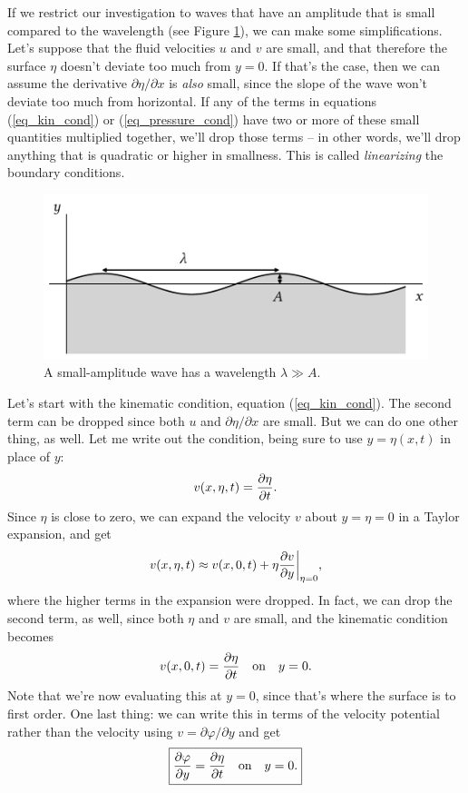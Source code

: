 If we restrict our investigation to waves that have an amplitude that is small compared to the wavelength (see Figure \ref{fig_small_wave}), we can make some simplifications.  Let's suppose that the fluid velocities $u$ and $v$ are small, and that therefore the surface $\eta$ doesn't deviate too much from $y = 0$.  If that's the case, then we can assume the derivative $\partial \eta / \partial x$ is \emph{also} small, since the slope of the wave won't deviate too much from horizontal.  If any of the terms in equations (\ref{eq_kin_cond}) or (\ref{eq_pressure_cond}) have two or more of these small quantities multiplied together, we'll drop those terms -- in other words, we'll drop anything that is quadratic or higher in smallness.  This is called \emph{linearizing} the boundary conditions.

\begin{figure}
\centering\includegraphics[width=0.8\linewidth]{Figures/Chapter5/fig_small_wave}
\caption{A small-amplitude wave has a wavelength $\lambda \gg A$.}
\label{fig_small_wave}
\end{figure}

Let's start with the kinematic condition, equation (\ref{eq_kin_cond}).  The second term can be dropped since both $u$ and $\partial \eta / \partial x$ are small.  But we can do one other thing, as well.  Let me  write out the condition, being sure to use $y = \eta(x, t)$ in place of $y$:
\[
v(x, \eta, t) = \frac{\partial {\eta}}{\partial {t}}.
\]
Since $\eta$ is close to zero, we can expand the velocity $v$ about $y = \eta = 0$ in a Taylor expansion, and get
\[
v(x, \eta, t) \approx v(x, 0, t) + \eta \frac{\partial {v}}{\partial {y}} \bigg|_{\eta=0},
\]
where the higher terms in the expansion were dropped.  In fact, we can drop the second term, as well, since both $\eta$ and $v$ are small, and the kinematic condition becomes
\[
v(x, 0, t) = \frac{\partial {\eta}}{\partial {t}} \quad \text{on} \quad y=0.
\]
Note that we're now evaluating this at $y=0$, since that's where the surface is to first order. One last thing: we can write this in terms of the velocity potential rather than the velocity using $v = \partial \varphi / \partial y$ and get
\begin{equation}
\label{eq_kin_cond_lin}
\boxed{
\frac{\partial {\varphi}}{\partial {y}} = \frac{\partial {\eta}}{\partial {t}} \quad \text{on} \quad y=0.
}
\end{equation}

